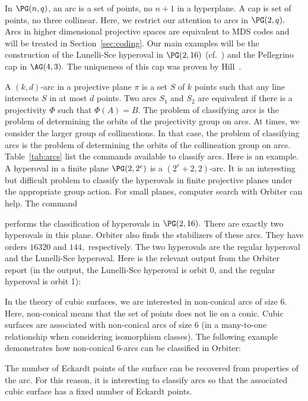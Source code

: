 
In $\PG(n,q)$, an arc is a set of points, no $n+1$ in a hyperplane.
A cap is set of points, no three collinear.
Here, we restrict our attention to arcs in $\PG(2,q).$  
Arcs in higher dimensional projective spaces 
are equivalent to MDS codes 
and will be treated in Section~\ref{sec:coding}.
Our main examples will be the construction of the Lunelli-Sce hyperoval in $\PG(2,16)$ 
(cf.~\cite{LunelliSce58})
and the Pellegrino cap in $\AG(4,3).$ 
The uniqueness of this cap was proven by Hill~\cite{Hill83}.

\bigskip


A $(k,d)$-arc in a projective plane $\pi$ 
is a set $S$ of $k$ points 
such that any line intersects $S$ in at most $d$ 
points. 
Two arcs $S_1$ and $S_2$ 
are equivalent if there is a projectivity 
$\Phi$ such that $\Phi(A) = B.$ 
The problem of classifying arcs 
is the problem of determining the orbits of the projectivity group on arcs. 
At times, 
we consider the larger group of collineations. 
In that case, the problem of classifying arcs is the 
problem of determining the orbits of the collineation group on arcs. 
Table~\ref{tab:arcs} list the commands available to classify arcs.
Here is an example. 
A hyperoval in a finite plane $\PG(2,2^e)$ is a $(2^e + 2,2)$-arc. 
It is an interesting but difficult problem to classify the hyperovals in finite 
projective planes under the appropriate group action.
For small planes, computer search with Orbiter can help.
The command 


performs the classification of hyperovals in $\PG(2,16).$ 
There are exactly two hyperovals in this plane. 
Orbiter also finds the stabilizers of these arcs. 
They have orders $16320$ and $144,$ respectively.
The two hyperovals are the regular hyperoval and the Lunelli-Sce hyperoval. 
Here is the relevant output from the Orbiter report 
(in the output, the Lunelli-Sce hyperoval is orbit 0, and the 
regular hyperoval is orbit 1):





\bigskip

In the theory of cubic surfaces, 
we are interested in non-conical arcs of size 6. 
Here, non-conical means that the set of points does not lie on a conic.
Cubic surfaces are associated with non-conical arcs of size 6 
(in a many-to-one relationship when considering isomorphism classes).
The following example demonstrates 
how non-conical 6-arcs can be classified in Orbiter:


The number of Eckardt points of the surface can be recovered from properties of the arc.
For this reason, it is interesting to classify arcs so that the associated 
cubic surface has a fixed number of Eckardt points.

